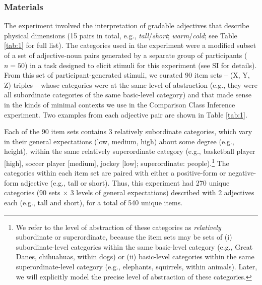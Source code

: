 \documentclass[doc]{apa6}
\begin{document}
\subsubsection{Materials}

The experiment involved the interpretation of gradable adjectives that describe physical dimensions (15 pairs in total, e.g., \emph{tall}/\emph{short}; \emph{warm}/\emph{cold}; see Table \ref{tab:1} for full list).
The categories used in the experiment were a modified subset of a set of adjective-noun pairs generated by a separate group of participants ($n=50$) in a task designed to elicit stimuli for this experiment (see SI for details).
From this set of participant-generated stimuli, we curated 90 item sets -- (X, Y, Z)  triples -- whose categories were at the same level of abstraction  (e.g., they were all subordinate categories of the same basic-level category) and that made sense in the kinds of minimal contexts we use in the Comparison Class Inference experiment.
Two examples from each adjective pair are shown in Table \ref{tab:1}.

Each of the 90 item sets contains 3 relatively subordinate categories, which vary in their general expectations (low, medium, high) about some degree (e.g., height), within the same relatively superordinate category (e.g., basketball player [high], soccer player [medium], jockey [low]; superordinate: people).\footnote{
We refer to the level of abstraction of these categories as \emph{relatively} subordinate or superordinate, because the item sets may be sets of (i) subordinate-level categories within the same basic-level category (e.g., Great Danes, chihuahuas, within dogs) or (ii) basic-level categories within the same superordinate-level category (e.g., elephants, squirrels, within animals). Later, we will explicitly model the precise level of abstraction of these categories.
}
The categories within each item set are paired with either a positive-form or negative-form adjective (e.g., tall or short).
Thus, this experiment had 270 unique categories (90 sets $\times$ 3 levels of general expectations) described with 2 adjectives each (e.g., tall and short), for a total of 540 unique items.
\end{document}
